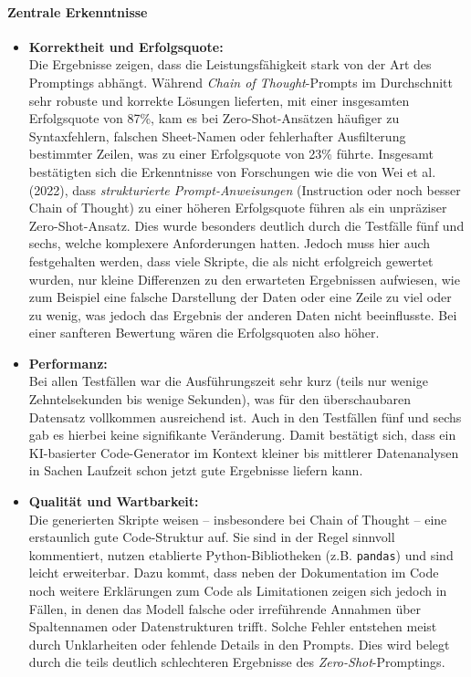 \documentclass[11pt,a4paper]{article}
\begin{document}
\paragraph{Zentrale Erkenntnisse}
\begin{itemize}
    \item \textbf{Korrektheit und Erfolgsquote:}\\Die Ergebnisse zeigen, dass die Leistungsfähigkeit stark von der Art des Promptings abhängt. Während \emph{Chain of Thought}-Prompts im Durchschnitt sehr robuste und korrekte Lösungen lieferten, mit einer insgesamten Erfolgsquote von 87\%, kam es bei Zero-Shot-Ansätzen häufiger zu Syntaxfehlern, falschen Sheet-Namen oder fehlerhafter Ausfilterung bestimmter Zeilen, was zu einer Erfolgsquote von 23\% führte. Insgesamt bestätigten sich die Erkenntnisse von Forschungen wie die von Wei et al. (2022)\cite{wei2023chainofthoughtpromptingelicitsreasoning}, dass \emph{strukturierte Prompt-Anweisungen} (Instruction oder noch besser Chain of Thought) zu einer höheren Erfolgsquote führen als ein unpräziser Zero-Shot-Ansatz. Dies wurde besonders deutlich durch die Testfälle fünf und sechs, welche komplexere Anforderungen hatten. Jedoch muss hier auch festgehalten werden, dass viele Skripte, die als nicht erfolgreich gewertet wurden, nur kleine Differenzen zu den erwarteten Ergebnissen aufwiesen, wie zum Beispiel eine falsche Darstellung der Daten oder eine Zeile zu viel oder zu wenig, was jedoch das Ergebnis der anderen Daten nicht beeinflusste. Bei einer sanfteren Bewertung wären die Erfolgsquoten also höher.
    \item \textbf{Performanz:}\\Bei allen Testfällen war die Ausführungszeit sehr kurz (teils nur wenige Zehntelsekunden bis wenige Sekunden), was für den überschaubaren Datensatz vollkommen ausreichend ist. Auch in den Testfällen fünf und sechs gab es hierbei keine signifikante Veränderung. Damit bestätigt sich, dass ein KI-basierter Code-Generator im Kontext kleiner bis mittlerer Datenanalysen in Sachen Laufzeit schon jetzt gute Ergebnisse liefern kann.
    \item \textbf{Qualität und Wartbarkeit:}\\Die generierten Skripte weisen – insbesondere bei Chain of Thought – eine erstaunlich gute Code-Struktur auf. Sie sind in der Regel sinnvoll kommentiert, nutzen etablierte Python-Bibliotheken (z.B. \texttt{pandas}) und sind leicht erweiterbar. Dazu kommt, dass neben der Dokumentation im Code noch weitere Erklärungen zum Code als  Limitationen zeigen sich jedoch in Fällen, in denen das Modell falsche oder irreführende Annahmen über Spaltennamen oder Datenstrukturen trifft. Solche Fehler entstehen meist durch Unklarheiten oder fehlende Details in den Prompts. Dies wird belegt durch die teils deutlich schlechteren Ergebnisse des \emph{Zero-Shot}-Promptings.

\end{itemize}
\end{document}

